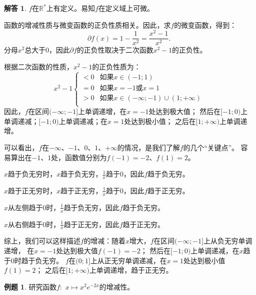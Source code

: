 \documentclass[12pt,UTF8]{ctexbook}
\theoremstyle{definition}
\newtheorem{et}{例题}[section]
\newtheorem*{so}{解答}
\theoremstyle{plain}
\begin{document}
\begin{so}
    $f$在$\mathbb{R}^*$上有定义。易知$f$在定义域上可微。

    函数的增减性质与微变函数的正负性质相关。因此，求$f$的微变函数，得到：
    $$ \partial f(x) = 1 - \frac{1}{x^2} = \frac{x^2 - 1}{x^2}.$$
    分母$ x^2 $总大于$0$，因此$ \partial f $的正负性取决于二次函数$x^2 - 1$的正负性。
    
    根据二次函数的性质，$x^2 - 1$的正负性质为：
    $$ x^2 - 1 \left\{
        \begin{array}{cl}
            < 0 & \mbox{如果}x \in (-1; 1) \\
            = 0 & \mbox{如果}x = -1 \mbox{或} x = 1 \\
            > 0 & \mbox{如果}x \in (-\infty; -1)\cup (1; +\infty)\\
        \end{array}\right.
    $$
    因此，$f$在区间$(-\infty; -1]$上单调递增，在$x = -1$处达到极大值；
    然后在$[-1; 0)$上单调递减；$[-1; 0)$上单调递减；在$x = 1$处达到极小值；
    之后在$[1; +\infty)$上单调递增。

    可以看出，$f$在$-\infty$、$-1$、$0$、$1$、$+\infty$的情况，是我们了解$f$的几个“关键点”。
    容易算出在$-1$、$1$处，函数值分别为$f(-1) = -2$、$f(1) = 2$。
    
    $x$趋于负无穷时，$x$趋于负无穷，$\frac{1}{x}$趋于$0$，因此$f$趋于负无穷。

    $x$趋于正无穷时，$x$趋于正无穷，$\frac{1}{x}$趋于$0$，因此$f$趋于正无穷。

    $x$从左侧趋于$0$时，$\frac{1}{x}$趋于负无穷，因此$f$趋于负无穷。
    
    $x$从右侧趋于$0$时，$\frac{1}{x}$趋于正无穷，因此$f$趋于正无穷。

    综上，我们可以这样描述$f$的增减：随着$x$增大，$f$在区间$(-\infty; -1]$上从负无穷单调递增，
    在$x = -1$处达到极大值$f(-1) = -2$；
    然后在$[-1; 0)$上单调递减，在$x$趋于$0$时趋于负无穷。
    $f$在$(0; 1]$上从正无穷单调递减，在$x = 1$处达到极小值$f(1) = 2$；
    之后在$[1; +\infty)$上单调递增，趋于正无穷。
\end{so}

\begin{et}
    研究函数$f:\,\,x\mapsto x^2 e^{-2x}$的增减性。
\end{et}
\end{document}
